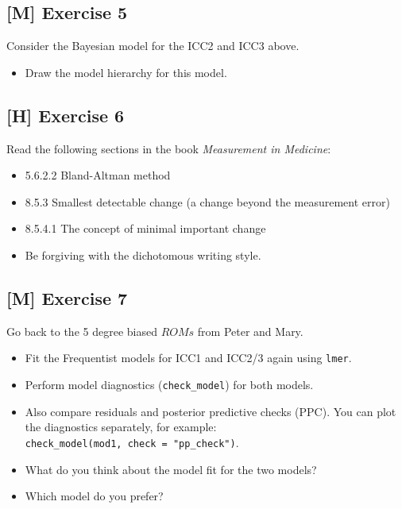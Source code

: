 \documentclass[
]{book}
\providecommand{\tightlist}{%
  \setlength{\itemsep}{0pt}\setlength{\parskip}{0pt}}
\begin{document}
\subsection{{[}M{]} Exercise 5}\label{exercise5}

Consider the Bayesian model for the ICC2 and ICC3 above.

\begin{itemize}
\tightlist
\item
  Draw the model hierarchy for this model.
\end{itemize}

\subsection{{[}H{]} Exercise 6}\label{exercise6}

Read the following sections in the book \emph{Measurement in Medicine}:

\begin{itemize}
\tightlist
\item
  5.6.2.2 Bland-Altman method
\item
  8.5.3 Smallest detectable change (a change beyond the measurement error)
\item
  8.5.4.1 The concept of minimal important change
\item
  Be forgiving with the dichotomous writing style.
\end{itemize}

\subsection{{[}M{]} Exercise 7}\label{exercise7}

Go back to the 5 degree biased \(ROMs\) from Peter and Mary.

\begin{itemize}
\tightlist
\item
  Fit the Frequentist models for ICC1 and ICC2/3 again using \texttt{lmer}.
\item
  Perform model diagnostics (\texttt{check\_model}) for both models.
\item
  Also compare residuals and posterior predictive checks (PPC). You can
  plot the diagnostics separately, for example: \texttt{check\_model(mod1,\ check\ =\ "pp\_check")}.
\item
  What do you think about the model fit for the two models?
\item
  Which model do you prefer?
\end{itemize}
\end{document}
